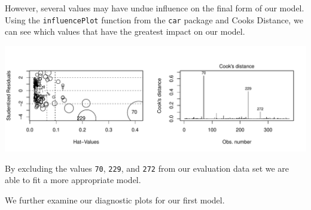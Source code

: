 \documentclass[]{elsarticle} %
\makeatletter
\def\maxwidth{\ifdim\Gin@nat@width>\linewidth\linewidth
\else\Gin@nat@width\fi}
\let\Oldincludegraphics\includegraphics
\renewcommand{\includegraphics}[1]{\Oldincludegraphics[width=\maxwidth]{#1}}
\makeatother
\begin{document}
However, several values may have undue influence on the final form of
our model. Using the \texttt{influencePlot} function from the
\texttt{car} package and Cooks Distance, we can see which values that
have the greatest impact on our model.

\includegraphics{Final_Project_files/figure-latex/unnamed-chunk-14-1.pdf}

By excluding the values \texttt{70}, \texttt{229}, and \texttt{272} from
our evaluation data set we are able to fit a more appropriate model.

We further examine our diagnostic plots for our first model.
\end{document}
